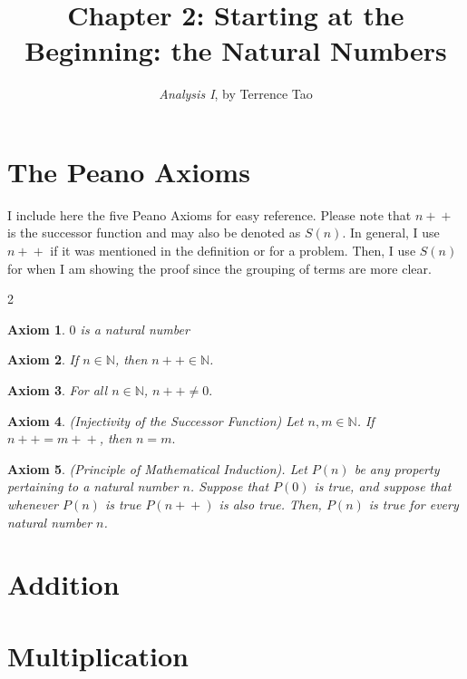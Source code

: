 \documentclass{extarticle}
\title{\vspace{-2em}Chapter 2: Starting at the Beginning: the Natural Numbers}
\author{\emph{Analysis I}, by Terrence Tao}
\date{}
\newcounter{prob}
\newtheorem{axiom}{Axiom}
\newcommand{\successor}[1]{#1 \! +\!\!\!+}
\begin{document}
\maketitle



\section{The Peano Axioms}
I include here the five Peano Axioms for easy reference. 
Please note that $\successor{n}$ is the successor function and may also be denoted as $S(n).$ 
In general, I use $\successor{n}$ if it was mentioned in the definition or for a problem.
Then, I use $S(n)$ for when I am showing the proof since the grouping of terms are more clear.

\begin{multicols}{2}
\begin{axiom}
$0$ is a natural number
\end{axiom}

\begin{axiom}
If $n \in \mathbb{N}$, then $\successor{n} \in \mathbb{N}$.
\end{axiom}

\begin{axiom}
For all $n \in \mathbb{N}$, $\successor{n} \neq 0.$
\end{axiom}

\begin{axiom}
(Injectivity of the Successor Function) Let $n, m \in \mathbb{N}$.
If $\successor{n} = \successor{m}$, then $n = m.$
\end{axiom}

\begin{axiom}
(Principle of Mathematical Induction). Let $P(n)$ be any property pertaining to a natural number $n$.
Suppose that $P(0)$ is true, and suppose that whenever $P(n)$ is true $P(\successor{n})$ is also true.
Then, $P(n)$ is true for every natural number $n$.
\end{axiom}
\end{multicols}

%





\section{Addition}

\break


\section{Multiplication}

\end{document}
